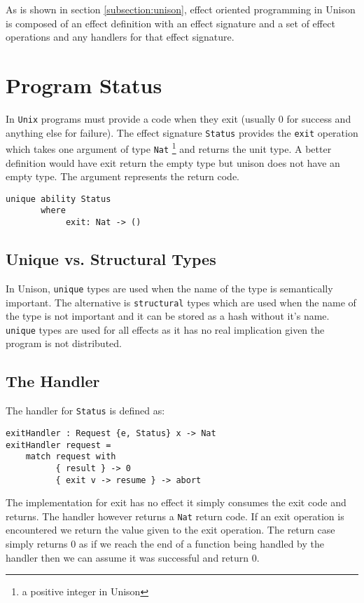 \documentclass[logo,bsc,singlespacing,parskip]{infthesis}
\begin{document}
As is shown in section \ref{subsection:unison}, effect oriented programming in
Unison is composed of an effect definition with an effect signature and a set
of effect operations and any handlers for that effect signature.

\section{Program Status}
\label{status}

In \texttt{Unix} programs must provide a code when they exit (usually 0 for
success and anything else for failure). The effect signature \texttt{Status}
provides the \texttt{exit} operation which takes one argument of type
\texttt{Nat} \footnote{a positive integer in Unison} and returns the unit type.
A better definition would have exit return the empty type but unison does not
have an empty type. The argument represents the return code.

\begin{lstlisting}[language=unison]
unique ability Status
       where
            exit: Nat -> ()
\end{lstlisting}

\subsection{Unique vs. Structural Types}

In Unison, \texttt{unique} types are used when the name of the type is
semantically important. The alternative is \texttt{structural} types which are
used when the name of the type is not important and it can be stored as a hash
without it's name. \texttt{unique} types are used for all effects as it has no
real implication given the program is not distributed.

\subsection{The Handler}

The handler for \texttt{Status} is defined as:

\begin{lstlisting}[language=unison]
exitHandler : Request {e, Status} x -> Nat
exitHandler request =
    match request with
          { result } -> 0
          { exit v -> resume } -> abort
\end{lstlisting}

The implementation for exit has no effect it simply consumes the exit code and
returns. The handler however returns a \texttt{Nat} return code. If an exit
operation is encountered we return the value given to the exit operation. The
return case simply returns 0 as if we reach the end of a function being handled
by the handler then we can assume it was successful and return 0.
\end{document}
